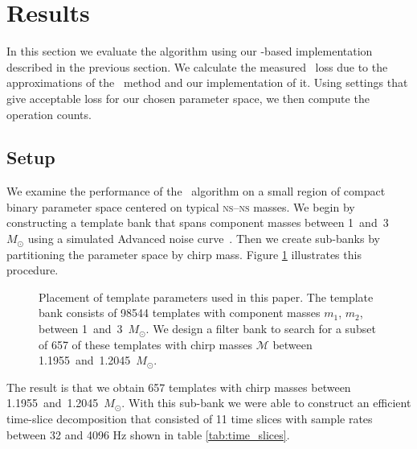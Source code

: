 \section{Results}
\label{sec:results}

In this section we evaluate the \lloid{} algorithm using our \gstreamer{}-based implementation described in the previous section. We calculate the
measured \SNR\ loss due to the approximations of the \lloid\ method and our
implementation of it. Using settings that give acceptable \SNR{} loss for
our chosen parameter space, we then compute the operation counts.

\subsection{Setup}

We examine the performance of the \lloid\ algorithm on a small region of
compact binary parameter space centered on typical \textsc{ns}--\textsc{ns}
masses.  We begin by constructing a template bank that spans component masses
between 1~and~3~$M_\odot$ using a simulated Advanced \LIGO{} noise
curve~\citep{ALIGONoise}.  Then we create sub-banks by partitioning the parameter
space by chirp mass.  Figure \ref{fig:tmpltbank} illustrates this procedure.
\begin{figure}[h]
	\caption{\label{fig:tmpltbank}Placement of template parameters used in this paper.  The template bank consists of 98544 templates with component masses $m_1$, $m_2$, between 1~and~3~$M_\odot$.  We design a filter bank to search for a subset of 657 of these templates with chirp masses $\mathcal M$ between 1.1955~and~1.2045~$M_\odot$.}
\end{figure}
The result is that we obtain 657 templates with chirp masses between 1.1955~and~1.2045~$M_\odot$.  With this
sub-bank we were able to construct an efficient time-slice decomposition that consisted of 11 time slices
with sample rates between 32 and 4096 Hz shown in table \ref{tab:time_slices}.

